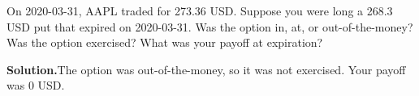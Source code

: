 \noindent On 2020-03-31, AAPL traded for 273.36 USD. Suppose you were long a 268.3 USD put that expired on 2020-03-31. Was the option in, at, or out-of-the-money? Was the option exercised? What was your payoff at expiration?

\vspace{9pt} 

\textbf{Solution.}The option was out-of-the-money, so it was not exercised. Your payoff was 0 USD.